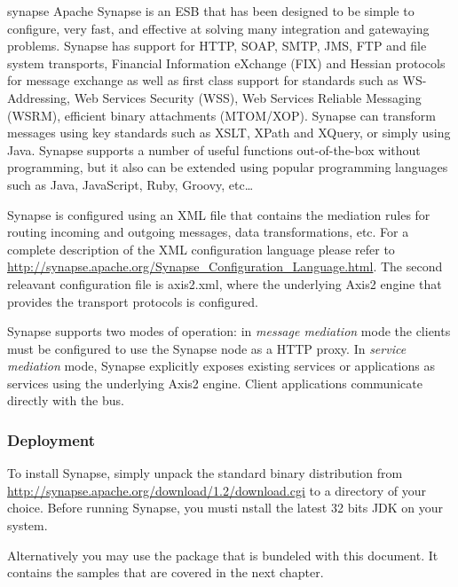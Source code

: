 \begin{mycite}{synapse}
Apache Synapse is an ESB that has been designed to be simple to configure, very
fast, and effective at solving many integration and gatewaying problems. Synapse
has support for HTTP, SOAP, SMTP, JMS, FTP and file system transports, Financial
Information eXchange (FIX) and Hessian protocols for message exchange as well as
first class support for standards such as WS-Addressing, Web Services Security
(WSS), Web Services Reliable Messaging (WSRM), efficient binary attachments
(MTOM/XOP). Synapse can transform messages using key standards such as XSLT,
XPath and XQuery, or simply using Java. Synapse supports a number of useful
functions out-of-the-box without programming, but it also can be extended using
popular programming languages such as Java, JavaScript, Ruby, Groovy, etc\ldots
\end{mycite}

Synapse is configured using an XML file that contains the mediation rules for
routing incoming and outgoing messages, data transformations, etc. For a
complete description of the XML configuration language please refer to 
\url{http://synapse.apache.org/Synapse_Configuration_Language.html}. The second
releavant configuration file is axis2.xml, where the underlying Axis2 engine
that provides the transport protocols is configured.


Synapse supports two modes of operation: in \emph{message mediation} mode
the clients must be configured to use the Synapse node as a HTTP proxy.
In \emph{service mediation} mode, Synapse explicitly exposes existing services
or applications as services using the underlying Axis2 engine. Client
applications communicate directly with the bus.

\subsubsection{Deployment}
\label{subsec:deployment}

To install Synapse, simply unpack the standard binary distribution from
\url{http://synapse.apache.org/download/1.2/download.cgi} to a directory of
your choice. Before running Synapse, you musti nstall the latest 32 bits JDK on
your system.

Alternatively you may use the package that is bundeled with this document. It
contains the samples that are covered in the next chapter.

